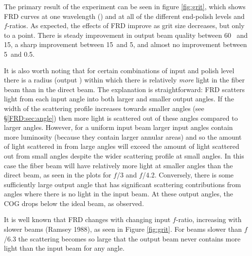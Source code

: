 The primary result of the experiment can be seen in figure
\ref{fig:grit}, which shows FRD curves at one wavelength (\filty) and at
all of the different end-polish levels and $f$-ratios. As expected,
the effects of FRD improve as grit size decreases, but only to a
point. There is steady improvement in output beam quality between 60
\mum\ and 15\mum, a sharp improvement between 15\mum\ and 5\mum,
and almost no improvement between 5\mum\ and 0.5\mum.

It is also worth noting that for certain combinations of input \fratio
and polish level there is a radius (output \fratio) within which there
is relatively \emph{more} light in the fiber beam than in the direct
beam.  The explanation is straightforward: FRD scatters light from
each input angle into both larger and smaller output angles. If the
width of the scattering profile increases towards smaller angles (see
\S\ref{FRD:sec:angle}) then more light is scattered out of these angles
compared to larger angles. However, for a uniform input beam
larger input angles contain more luminosity (because they contain
larger annular areas) and so the amount of light scattered in from large
angles will exceed the amount of light scattered out from small angles
despite the wider scattering profile at small angles. In this case the
fiber beam will have relatively more light at smaller angles than the
direct beam, as seen in the plots for $f$/3 and $f$/4.2. Conversely,
there is some sufficiently large output angle that has
significant scattering contributions from angles where there is no
light in the input beam. At these output angles, the COG drops below
the ideal beam, as observed.

It is well known that FRD changes with changing input $f$-ratio,
increasing with slower beams (Ramsey 1988)\cite{Ramsey88}, as seen in Figure
\ref{fig:grit}.  For beams slower than $f$/6.3 the scattering becomes so
large that the output beam never contains more light than the input
beam for any angle.

